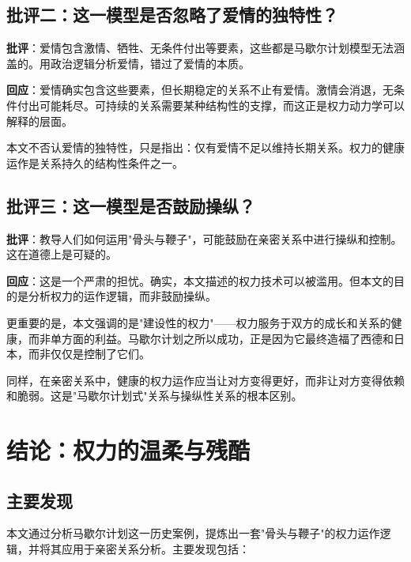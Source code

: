 \documentclass[12pt,a4paper]{article}
\begin{document}
\subsection{批评二：这一模型是否忽略了爱情的独特性？}

\textbf{批评}：爱情包含激情、牺牲、无条件付出等要素，这些都是马歇尔计划模型无法涵盖的。用政治逻辑分析爱情，错过了爱情的本质。

\textbf{回应}：爱情确实包含这些要素，但长期稳定的关系不止有爱情。激情会消退，无条件付出可能耗尽。可持续的关系需要某种结构性的支撑，而这正是权力动力学可以解释的层面。

本文不否认爱情的独特性，只是指出：仅有爱情不足以维持长期关系。权力的健康运作是关系持久的结构性条件之一。

\subsection{批评三：这一模型是否鼓励操纵？}

\textbf{批评}：教导人们如何运用"骨头与鞭子"，可能鼓励在亲密关系中进行操纵和控制。这在道德上是可疑的。

\textbf{回应}：这是一个严肃的担忧。确实，本文描述的权力技术可以被滥用。但本文的目的是分析权力的运作逻辑，而非鼓励操纵。

更重要的是，本文强调的是"建设性的权力"——权力服务于双方的成长和关系的健康，而非单方面的利益。马歇尔计划之所以成功，正是因为它最终造福了西德和日本，而非仅仅是控制了它们。

同样，在亲密关系中，健康的权力运作应当让对方变得更好，而非让对方变得依赖和脆弱。这是"马歇尔计划式"关系与操纵性关系的根本区别。

\section{结论：权力的温柔与残酷}

\subsection{主要发现}

本文通过分析马歇尔计划这一历史案例，提炼出一套"骨头与鞭子"的权力运作逻辑，并将其应用于亲密关系分析。主要发现包括：
\end{document}
